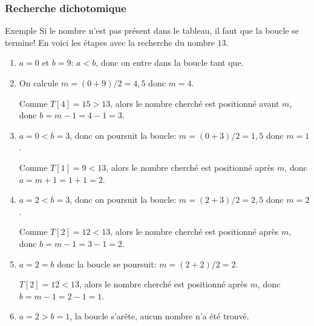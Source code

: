 \documentclass[9pt]{beamer}
\newcounter{num}
\begin{document}
\begin{frame}
\frametitle{Recherche dichotomique}

\begin{exampleblock}{Exemple}
Si le nombre n'est pas présent dans le tableau, il faut que la boucle se termine! En voici les étapes avec la recherche du nombre $13$.
\begin{enumerate}
\item $a=0$ et $b=9$: $a<b$, donc on entre dans la boucle tant que.
\item On calcule $m=(0+9)/2=4,5$ donc $m=4$.

Comme $T[4]=15>13$, alors le nombre cherché est positionné avant $m$, donc $b=m-1=4-1=3$.

\item $a=0<b=3$, donc on poursuit la boucle: $m=(0+3)/2=1,5$ donc $m=1$.

Comme $T[1]=9<13$, alors le nombre cherché est positionné après $m$, donc $a=m+1=1+1=2$.
\item $a=2<b=3$, donc on poursuit la boucle: $m=(2+3)/2=2,5$ donc $m=2$.

Comme $T[2]=12<13$, alors le nombre cherché est positionné après $m$, donc $b=m-1=3-1=2$.

\item $a=2=b$ donc la boucle se poursuit: $m=(2+2)/2=2$.

$T[2]=12<13$, alors le nombre cherché est positionné après $m$, donc $b=m-1=2-1=1$.

\item $a=2>b=1$, la boucle s'arête, aucun nombre n'a été trouvé.
\end{enumerate}
\end{exampleblock}
\end{frame}
\end{document}
